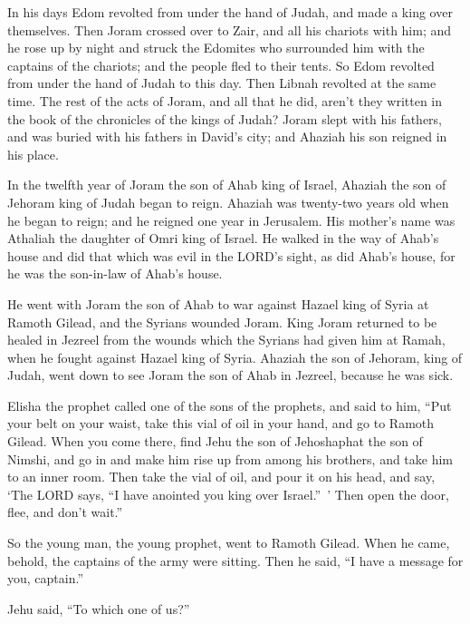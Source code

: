 \myverse{}In his days Edom revolted from under the hand of Judah, and made
a king over themselves.
\myverse{}Then Joram crossed over to Zair, and all his chariots with him; and he rose
up by night and struck the Edomites who surrounded him with the captains of the chariots; and the people
fled to their tents.
\myverse{}So Edom revolted from under the hand of Judah to this day. Then Libnah revolted
at the same time.
\myverse{}The rest of the acts of Joram, and all that he did, aren’t they written in
the book of the chronicles of the kings of Judah?
\myverse{}Joram slept with his fathers, and was buried with his fathers in David’s city;
and Ahaziah his son reigned in his place.

\myverse{}In the twelfth year of Joram the son of Ahab king of Israel,
Ahaziah the son of Jehoram king of Judah began to reign.
\myverse{}Ahaziah was twenty-two years old when he began to reign; and he reigned one
year in Jerusalem. His mother’s name was Athaliah the daughter of Omri king of Israel.
\myverse{}He walked in the way of Ahab’s house and did that which was evil in the LORD’s
sight, as did Ahab’s house, for he was the son-in-law of Ahab’s house.

\myverse{}He went with Joram the son of Ahab to war against Hazael king
of Syria at Ramoth Gilead, and the Syrians wounded Joram.
\myverse{}King Joram returned to be healed in Jezreel from the wounds which the Syrians
had given him at Ramah, when he fought against Hazael king of Syria. Ahaziah the son of Jehoram, king
of Judah, went down to see Joram the son of Ahab in Jezreel, because he was sick.


\mychapter{} \myverse*{}Elisha the prophet called one of the sons of the prophets, and
said to him, “Put your belt on your waist, take this vial of oil in your hand, and go to Ramoth Gilead.
\myverse{}When you come there, find Jehu the son of Jehoshaphat the son of Nimshi, and
go in and make him rise up from among his brothers, and take him to an inner room.
\myverse{}Then take the vial of oil, and pour it on his head, and say, ‘The LORD says,
“I have anointed you king over Israel.” ’ Then open the door, flee, and don’t wait.”

\myverse{}So the young man, the young prophet, went to Ramoth Gilead.
\myverse{}When he came, behold, the captains of the army were sitting. Then he said, “I
have a message for you, captain.”

Jehu said, “To which one of us?”

